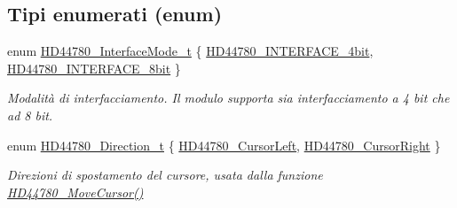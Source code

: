 \subsection*{Tipi enumerati (enum)}
\begin{DoxyCompactItemize}
\item 
enum \hyperlink{group___h_d44780_gaaaea8b73e24f7658da4118f6b01b45f0}{H\+D44780\+\_\+\+Interface\+Mode\+\_\+t} \{ \hyperlink{group___h_d44780_ggaaaea8b73e24f7658da4118f6b01b45f0a45bf6ce7ec7c951f692bdce9f0f485c6}{H\+D44780\+\_\+\+I\+N\+T\+E\+R\+F\+A\+C\+E\+\_\+4bit}, 
\hyperlink{group___h_d44780_ggaaaea8b73e24f7658da4118f6b01b45f0a24da9b234f9358c14184fe21f3c47de5}{H\+D44780\+\_\+\+I\+N\+T\+E\+R\+F\+A\+C\+E\+\_\+8bit}
 \}
\begin{DoxyCompactList}\small\item\em Modalità di interfacciamento. Il modulo supporta sia interfacciamento a 4 bit che ad 8 bit. \end{DoxyCompactList}\item 
enum \hyperlink{group___h_d44780_gaf46f4db4f981d3a1088804a6d6980d30}{H\+D44780\+\_\+\+Direction\+\_\+t} \{ \hyperlink{group___h_d44780_ggaf46f4db4f981d3a1088804a6d6980d30aa4d704398d4edd1e0dec8dbb55f90292}{H\+D44780\+\_\+\+Cursor\+Left}, 
\hyperlink{group___h_d44780_ggaf46f4db4f981d3a1088804a6d6980d30a26006ced693b6bab28c6e30bfdb8c399}{H\+D44780\+\_\+\+Cursor\+Right}
 \}
\begin{DoxyCompactList}\small\item\em Direzioni di spostamento del cursore, usata dalla funzione \hyperlink{group___h_d44780_gabcea9a03050c46530e39b7556c673baf}{H\+D44780\+\_\+\+Move\+Cursor()} \end{DoxyCompactList}\end{DoxyCompactItemize}
